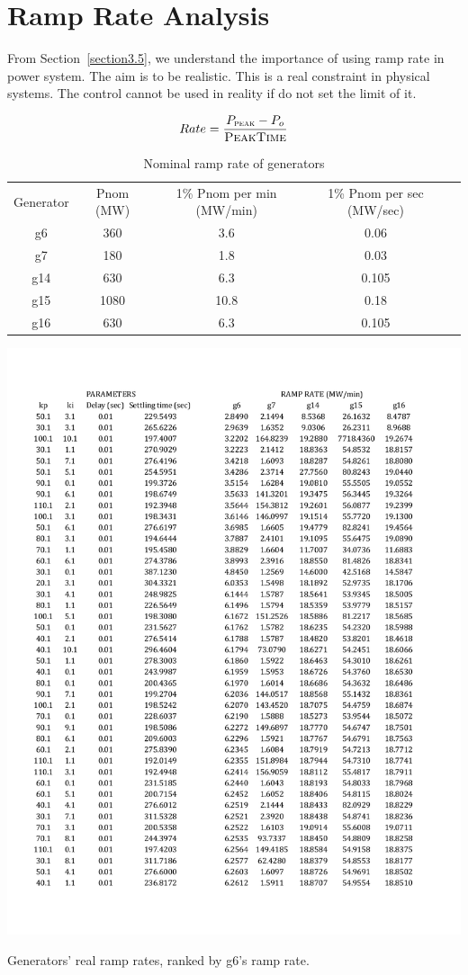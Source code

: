 \section{Ramp Rate Analysis} %
\label{section4.5}

From Section~\ref{section3.5}, we understand the importance of using ramp rate in power system. The aim is to be realistic. This is a real constraint in physical systems. The control cannot be used in reality if do not set the limit of it.

\begin{equation}
    Rate = \frac{P_{\textsc{peak}} - P_o}{\textsc{PeakTime}}
\end{equation}



\begin{table}[htbp]
  \centering
    \begin{tabular}{ccccc}
    Generator & Pnom (MW) & 1\% Pnom per min (MW/min) & 1\% Pnom per sec (MW/sec)\\
    g6    & 360   & 3.6   & 0.06\\
    g7    & 180   & 1.8   & 0.03\\
    g14   & 630   & 6.3   & 0.105\\
    g15   & 1080  & 10.8  & 0.18\\
    g16   & 630   & 6.3   & 0.105\\
    \end{tabular}
  \caption{Nominal ramp rate of generators}
  \label{4_5_nominal_rate}
\end{table}



\begin{table}[htbp]
\centering
\includegraphics[width = \textwidth]{figure/4_5_risk.pdf}
\caption{Generators' real ramp rates, ranked by g6's ramp rate.}
\label{4_5_risk}
\end{table}